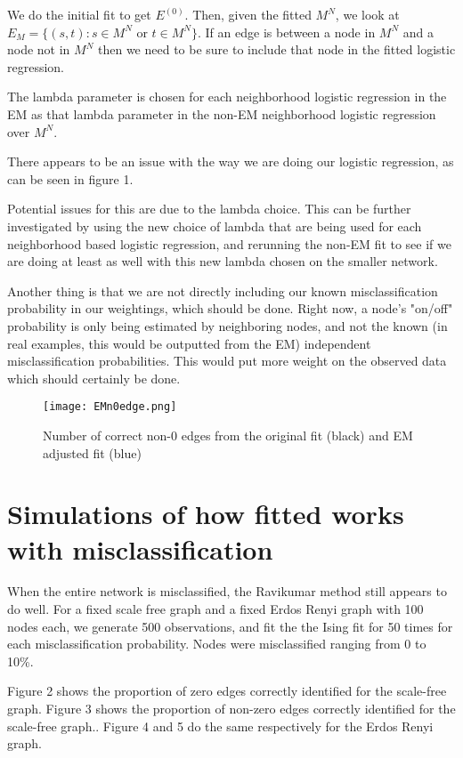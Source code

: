 \documentclass[12pt]{article}
\begin{document}
We do the initial fit to get $E^{(0)}$.  Then, given the fitted $M^N$, we look at $E_M = \{(s, t) : s \in M^N \text{ or } t \in M^N\}$.  If an edge is between a node in $M^N$ and a node not in $M^N$ then we need to be sure to include that node in the fitted logistic regression.

The lambda parameter is chosen for each neighborhood logistic regression in the EM as that lambda parameter in the non-EM neighborhood logistic regression over $M^N$. 

There appears to be an issue with the way we are doing our logistic regression, as can be seen in figure 1. 

Potential issues for this are due to the lambda choice.  This can be further investigated by using the new choice of lambda that are being used for each neighborhood based logistic regression, and rerunning the non-EM fit to see if we are doing at least as well with this new lambda chosen on the smaller network. 

Another thing is that we are not directly including our known misclassification probability in our weightings, which should be done.  Right now, a node's "on/off" probability is only being estimated by neighboring nodes, and not the known (in real examples, this would be outputted from the EM) independent misclassification probabilities.  This would put more weight on the observed data which should certainly be done.
\begin{figure}[h!]
\centering
\texttt{[image: EMn0edge.png]}
\caption{Number of correct non-0 edges from the original fit (black) and EM adjusted fit (blue)}
\end{figure}


\section{Simulations of how fitted works with misclassification}
When the entire network is misclassified, the Ravikumar method still appears to do well. For a fixed scale free graph and a fixed Erdos Renyi graph with 100 nodes each, we generate 500 observations, and fit the the Ising fit for 50 times for each misclassification probability. Nodes were misclassified ranging from 0 to 10\%.  

Figure 2 shows the proportion of zero edges correctly identified for the scale-free graph.  Figure 3 shows the proportion of non-zero edges correctly identified for the scale-free graph.. Figure 4 and 5 do the same respectively for the Erdos Renyi graph.
\end{document}
